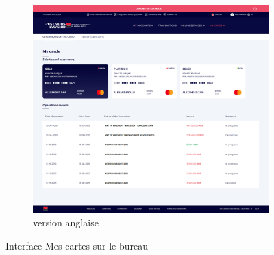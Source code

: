 \begin{figure}[!ht]
\begin{subfigure}[b]{0.49\textwidth}
        \includegraphics[width=\textwidth]{images/screens/cards/desktop.png}
        \caption{version anglaise}
    \end{subfigure}
       \caption{Interface Mes cartes sur le bureau}
\end{figure}

\newpage

